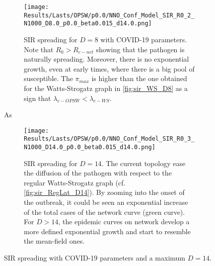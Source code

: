 \documentclass[a4paper,10pt]{book} %
\theoremstyle{definition}
\begin{document}
\begin{figure}[p]
	\centering
    \begin{subfigure}[t]{\linewidth}
        \texttt{[image: Results/Lasts/OPSW/p0.0/NNO\_Conf\_Model\_SIR\_R0\_2\_N1000\_D8.0\_p0.0\_beta0.015\_d14.0.png]}
		\centering
        \caption{SIR spreading for $D = 8$ with COVID-19 parameters. Note that $R_0 > R_{c-net}$ showing that the pathogen is naturally spreading. Moreover, there is no exponential growth, even at early times, where there is a big pool of susceptible. The $\pi_{max} $ is higher than the one obtained for the Watts-Strogatz graph in \autoref{fig:sir_WS_D8} as a sign that $\lambda_{c-OPSW} < \lambda_{c-WS}$.}
        \label{fig:sir_O-PSW_D8}
    \end{subfigure}As
	\vfill
	\begin{subfigure}[b]{\linewidth}
		\centering
        \texttt{[image: Results/Lasts/OPSW/p0.0/NNO\_Conf\_Model\_SIR\_R0\_3\_N1000\_D14.0\_p0.0\_beta0.015\_d14.0.png]}
        \caption{SIR spreading for $D = 14$. The current topology ease the diffusion of the pathogen with respect to the regular Watts-Strogatz graph (cf. \autoref{fig:sir_RegLat_D14}). By zooming into the onset of the outbreak, it could be seen an exponential increase of the total cases of the network curve (green curve). For $D > 14$, the epidemic curves on network develop a more defined exponential growth and start to resemble the mean-field ones.}
        \label{fig:sir_O-PSW_D14_p0}
    \end{subfigure}
	\caption{SIR spreading with COVID-19 parameters and a maximum $D = 14$.}
	\label{fig:sir_O-PSW_COVID}
\end{figure}
\end{document}
